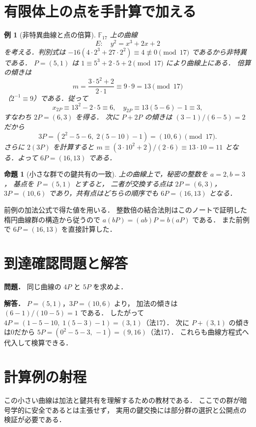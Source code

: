 \documentclass[a5paper,10pt,onecolumn]{jsarticle}
\makeatletter
\theoremstyle{mathnotetheorem}
\newtheorem{proposition}[theorem]{命題}
\newtheorem{example}[theorem]{例}
\renewcommand{\proofname}{証明}
\renewenvironment{proof}[1][\proofname]{%
  \par\pushQED{\qed}\normalfont\topsep4\p@\@plus2\p@\relax
  \trivlist\item[\hskip\labelsep\bfseries #1]\ignorespaces
}{\popQED\endtrivlist\@endpefalse}
\makeatother
\begin{document}
\section{有限体上の点を手計算で加える}
\begin{example}[非特異曲線と点の倍算]
$\mathbb F_{17}$ 上の曲線
\[
 E:\quad y^2=x^3+2x+2
\]
を考える．判別式は
$-16(4\cdot2^3+27\cdot2^2)\equiv4\not\equiv0
\pmod{17}$ であるから非特異である．
$P=(5,1)$ は $1\equiv5^3+2\cdot5+2\pmod{17}$
により曲線上にある．
倍算の傾きは
\[
 m=\frac{3\cdot5^2+2}{2\cdot1}
 \equiv9\cdot9=13\pmod{17}
\]
（$2^{-1}\equiv9$）である．従って
\[
 x_{2P}\equiv13^2-2\cdot5\equiv6,\quad
 y_{2P}\equiv13(5-6)-1\equiv3,
\]
すなわち $2P=(6,3)$ を得る．
次に $P+2P$ の傾きは
$(3-1)/(6-5)=2$ だから
\[
 3P=(2^2-5-6,\;2(5-10)-1)=(10,6)
 \pmod{17}.
\]
さらに $2(3P)$ を計算すると
$m\equiv(3\cdot10^2+2)/(2\cdot6)
 \equiv13\cdot10=11$ となる．よって
$6P=(16,13)$ である．
\end{example}
\begin{proposition}[小さな群での鍵共有の一致]
上の曲線上で，秘密の整数を $a=2,b=3$，
基点を $P=(5,1)$ とすると，
二者が交換する点は $2P=(6,3)$，
$3P=(10,6)$ であり，共有点はどちらの順序でも
$6P=(16,13)$ となる．
\end{proposition}
\begin{proof}
前例の加法公式で得た値を用いる．
整数倍の結合法則はこのノートで証明した
楕円曲線群の構造から従うので
$a(bP)=(ab)P=b(aP)$ である．
また前例で $6P=(16,13)$ を直接計算した．
\end{proof}
\section*{到達確認問題と解答}
\noindent\textbf{問題．}
同じ曲線の $4P$ と $5P$ を求めよ．

\medskip\noindent\textbf{解答．}
$P=(5,1)$，$3P=(10,6)$ より，
加法の傾きは $(6-1)/(10-5)=1$ である．
したがって
$4P=(1-5-10,\;1(5-3)-1)=(3,1)$（法17）．
次に $P+(3,1)$ の傾きは0だから
$5P=(0^2-5-3,\,-1)=(9,16)$（法17）．
これらも曲線方程式へ代入して検算できる．
\section*{計算例の射程}
この小さい曲線は加法と鍵共有を理解するための教材である．
ここでの群が暗号学的に安全であるとは主張せず，
実用の鍵交換には部分群の選択と公開点の検証が必要である．
\end{document}
